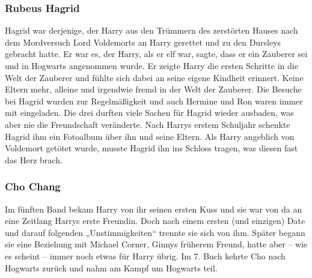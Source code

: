 \documentclass[a4paper, 10pt]{article}
\begin{document}
\subsubsection*{\large Rubeus Hagrid}
Hagrid war derjenige, der Harry aus den Trümmern des zerstörten Hauses nach dem Mordversuch Lord Voldemorts an Harry gerettet und zu den Dursleys gebracht hatte. Er war es, der Harry, als er elf war, sagte, dass er ein Zauberer sei und in Hogwarts angenommen wurde. Er zeigte Harry die ersten Schritte in die Welt der Zauberer und fühlte sich dabei an seine eigene Kindheit erinnert. Keine Eltern mehr, alleine und irgendwie fremd in der Welt der Zauberer.
\vspace{10pt}
\newline
Die Besuche bei Hagrid wurden zur Regelmäßigkeit und auch Hermine und Ron waren immer mit eingeladen. Die drei durften viele Sachen für Hagrid wieder ausbaden, was aber nie die Freundschaft veränderte.
\vspace{10pt}
\newline
Nach Harrys erstem Schuljahr schenkte Hagrid ihm ein Fotoalbum über ihn und seine Eltern.
\vspace{10pt}
\newline
Als Harry angeblich von Voldemort getötet wurde, musste Hagrid ihn ins Schloss tragen, was diesen fast das Herz brach.
\subsubsection*{\large Cho Chang}
Im fünften Band bekam Harry von ihr seinen ersten Kuss und sie war von da an eine Zeitlang Harrys erste Freundin. Doch nach einem ersten (und einzigen) Date und darauf folgenden „Unstimmigkeiten“ trennte sie sich von ihm. Später begann sie eine Beziehung mit Michael Corner, Ginnys früherem Freund, hatte aber – wie es scheint – immer noch etwas für Harry übrig. Im 7. Buch kehrte Cho nach Hogwarts zurück und nahm am Kampf um Hogwarts teil.
\end{document}
